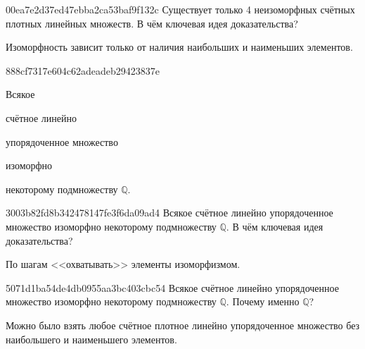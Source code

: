 \begin{note}{00ea7e2d37ed47ebba2ca53baf9f132c}
    Существует только 4 неизоморфных счётных плотных линейных множеств.
    В чём ключевая идея доказательства?

    \begin{cloze}{1}
        Изоморфность зависит только от наличия наибольших и наименьших элементов.
    \end{cloze}
\end{note}

\begin{note}{888cf7317e604c62adeadeb29423837e}
    \begin{icloze}{4}Всякое\end{icloze} \begin{icloze}{3}счётное линейно\end{icloze} упорядоченное множество \begin{icloze}{2}изоморфно\end{icloze} \begin{icloze}{1}некоторому подмножеству \({ \mathbb Q }\).\end{icloze}
\end{note}

\begin{note}{3003b82fd8b342478147fe3f6da09ad4}
    Всякое счётное линейно упорядоченное множество изоморфно некоторому подмножеству \({ \mathbb Q }\).
    В чём ключевая идея доказательства?

    \begin{cloze}{1}
        По шагам <<охватывать>> элементы изоморфизмом.
    \end{cloze}
\end{note}

\begin{note}{5071d1ba54de4db0955aa3bc403cbc54}
    Всякое счётное линейно упорядоченное множество изоморфно некоторому подмножеству \({ \mathbb Q }\).
    Почему именно \({ \mathbb Q }\)?

    \begin{cloze}{1}
        Можно было взять любое счётное плотное линейно упорядоченное множество без наибольшего и наименьшего элементов.
    \end{cloze}
\end{note}


